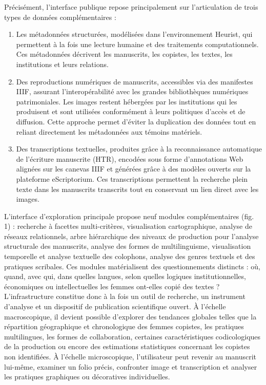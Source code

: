 \documentclass[final, fra]{anthology-ch}      %
\begin{document}
Précisément, l'interface publique repose principalement sur l’articulation de trois types de données complémentaires :
\begin{enumerate}
    \item Les métadonnées structurées, modélisées dans l’environnement Heurist, qui permettent à la fois une lecture humaine et des traitements computationnels. Ces métadonnées décrivent les manuscrits, les copistes, les textes, les institutions et leurs relations.
    \item Des reproductions numériques de manuscrits, accessibles via des manifestes IIIF, assurant l’interopérabilité avec les grandes bibliothèques numériques patrimoniales. Les images restent hébergées par les institutions qui les produisent et sont utilisées conformément à leurs politiques d’accès et de diffusion. Cette approche permet d’éviter la duplication des données tout en reliant directement les métadonnées aux témoins matériels.
    \item Des transcriptions textuelles, produites grâce à la reconnaissance automatique de l’écriture manuscrite (HTR), encodées sous forme d’annotations Web alignées sur les canevas IIIF et générées grâce à des modèles ouverts sur la plateforme eScriptorium. Ces transcriptions permettent la recherche plein texte dans les manuscrits transcrits tout en conservant un lien direct avec les images.
\end{enumerate}

L'interface d'exploration principale propose neuf modules complémentaires (fig. 1) : recherche à facettes multi-critères, visualisation cartographique, analyse de réseaux relationnels, arbre hiérarchique des niveaux de production pour l’analyse structurale des manuscrits, analyse des formes de multilinguisme, visualisation temporelle et analyse textuelle des colophons, analyse des genres textuels et des pratiques scribales. Ces modules matérialisent des questionnements distincts : où, quand, avec qui, dans quelles langues, selon quelles logiques institutionnelles, économiques ou intellectuelles les femmes ont-elles copié des textes ?  L’infrastructure constitue donc à la fois un outil de recherche, un instrument d’analyse et un dispositif de publication scientifique ouvert. À l’échelle macroscopique, il devient possible d’explorer des tendances globales telles que la répartition géographique et chronologique des femmes copistes, les pratiques multilingues, les formes de collaboration, certaines caractéristiques codicologiques de la production ou encore des estimations statistiques concernant les copistes non identifiées. À l’échelle microscopique, l’utilisateur peut revenir au manuscrit lui-même, examiner un folio précis, confronter image et transcription et analyser les pratiques graphiques ou décoratives individuelles.
\end{document}
